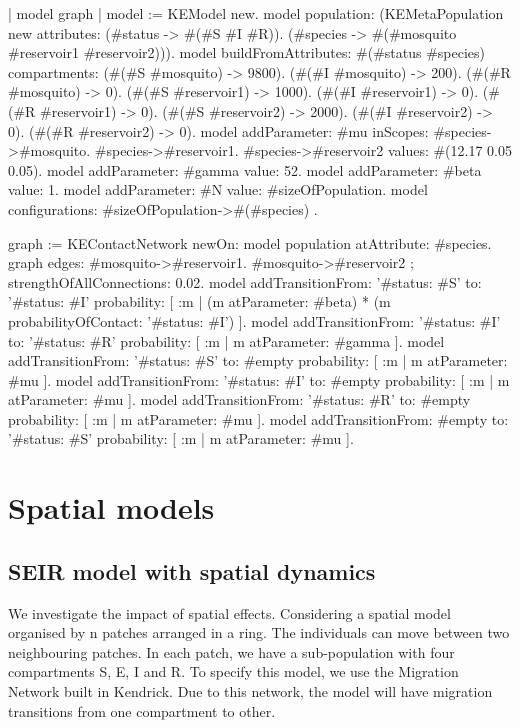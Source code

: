 \documentclass[a4paper,10pt,twoside]{book}
\begin{document}
\begin{code}{}
| model graph |
	model := KEModel new.
	model
		population:
			(KEMetaPopulation new
				attributes:
					{(#status -> #(#S #I #R)).
					(#species -> #(#mosquito #reservoir1 #reservoir2))}).
	model
		buildFromAttributes: #(#status #species)
		compartments:
			{(#(#S #mosquito) -> 9800).
			(#(#I #mosquito) -> 200).
			(#(#R #mosquito) -> 0).
			(#(#S #reservoir1) -> 1000).
			(#(#I #reservoir1) -> 0).
			(#(#R #reservoir1) -> 0).
			(#(#S #reservoir2) -> 2000).
			(#(#I #reservoir2) -> 0).
			(#(#R #reservoir2) -> 0)}.
	model addParameter: #mu
		   inScopes: {
				#species->#mosquito.
				#species->#reservoir1.
				#species->#reservoir2}
		   values: #(12.17 0.05 0.05).
	model addParameter: #gamma value: 52.
	model addParameter: #beta value: 1.
	model addParameter: #N value: #sizeOfPopulation.
	model configurations: { #sizeOfPopulation->#(#species) }.

	graph := KEContactNetwork
			newOn: model population
			atAttribute: #species.
	graph edges: { #mosquito->#reservoir1. #mosquito->#reservoir2 };
			strengthOfAllConnections: 0.02.
	model
		addTransitionFrom: '{#status: #S}'
		to: '{#status: #I}'
		probability: [ :m | (m atParameter: #beta) * (m probabilityOfContact: '{#status: #I}') ].
	model
		addTransitionFrom: '{#status: #I}'
		to: '{#status: #R}'
		probability: [ :m | m atParameter: #gamma ].
	model
		addTransitionFrom: '{#status: #S}'
		to: #empty
		probability: [ :m | m atParameter: #mu ].
	model
		addTransitionFrom: '{#status: #I}'
		to: #empty
		probability: [ :m | m atParameter: #mu ].
	model
		addTransitionFrom: '{#status: #R}'
		to: #empty
		probability: [ :m | m atParameter: #mu ].
	model
		addTransitionFrom: #empty
		to: '{#status: #S}'
		probability: [ :m | m atParameter: #mu ].
\end{code}

\chapter{ Spatial models}\section{ SEIR model with spatial dynamics}
We investigate the impact of spatial effects.
Considering a spatial model organised by n patches arranged in a ring.
The individuals can move between two neighbouring patches.
In each patch, we have a sub-population with four compartments S, E, I and R.
To specify this model, we use the Migration Network built in Kendrick. Due to this network, the model will have migration transitions from one compartment to other.
\end{document}
